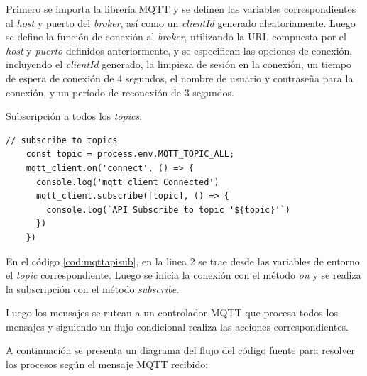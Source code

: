 Primero se importa la librería MQTT y se definen las variables correspondientes al \textit{host} y puerto del \textit{broker}, así como un \textit{clientId} generado aleatoriamente. Luego se define la función de conexión al \textit{broker}, utilizando la URL compuesta por el \textit{host} y \textit{puerto} definidos anteriormente, y se especifican las opciones de conexión, incluyendo el \textit{clientId} generado, la limpieza de sesión en la conexión, un tiempo de espera de conexión de 4 segundos, el nombre de usuario y contraseña para la conexión, y un período de reconexión de 3 segundos.


Subscripción a todos los \textit{topics}:

\begin{lstlisting}[label=cod:mqttapisub,caption=Subscripción a \textit{topics} en API REST.]
// subscribe to topics
    const topic = process.env.MQTT_TOPIC_ALL;
    mqtt_client.on('connect', () => {
      console.log('mqtt client Connected')
      mqtt_client.subscribe([topic], () => {
        console.log(`API Subscribe to topic '${topic}'`)
      })
    })
\end{lstlisting}

En el código \ref{cod:mqttapisub}, en la linea 2 se trae desde las variables de entorno el \textit{topic} correspondiente. Luego se inicia la conexión con el método \textit{on} y se realiza la subscripción con el método \textit{subscribe}. 

Luego los mensajes se rutean a un controlador MQTT que procesa todos los mensajes y siguiendo un flujo condicional realiza las acciones correspondientes.

A continuación se presenta un diagrama del flujo del código fuente para resolver los procesos según el mensaje MQTT recibido:

